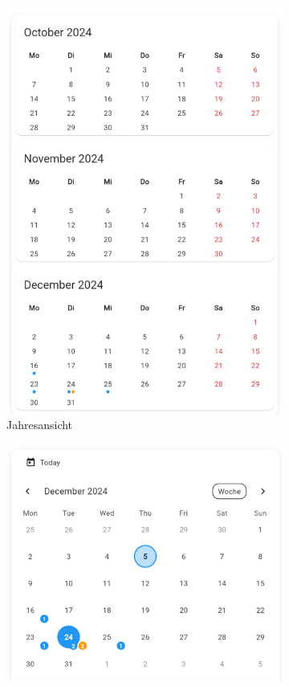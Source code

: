 \begin{figure}[htbp!]
    \centering
    \begin{subfigure}[b]{0.45\textwidth}
        \centering
        \includegraphics[scale=0.6]{img/Markierung_Dezember_JAhresansicht.png}
        \caption{Jahresansicht}
    \end{subfigure}
    \hfill
    \begin{subfigure}[b]{0.45\textwidth}
        \centering
        \includegraphics[scale=0.6]{img/Markierung_Dezember_Monatansicht.png}

\end{subfigure}
\end{figure}
